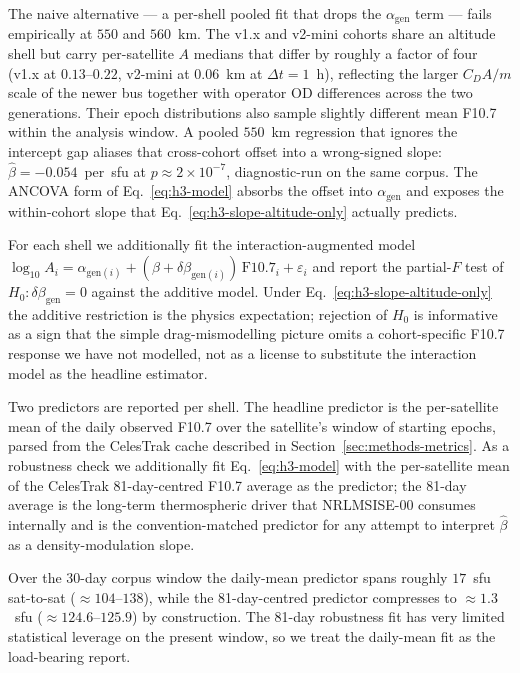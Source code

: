 \documentclass[10pt, letterpaper]{article}
\begin{document}
The naive alternative --- a per-shell pooled fit that drops the
$\alpha_{\mathrm{gen}}$ term --- fails empirically at $550$ and
$560$~km. The v1.x and v2-mini cohorts share an altitude shell
but carry per-satellite $A$ medians that differ by roughly a
factor of four (v1.x at $0.13$--$0.22$, v2-mini at $0.06$~km at
$\Delta t = 1$~h), reflecting the larger $C_{D} A / m$ scale of
the newer bus together with operator OD differences across the
two generations. Their epoch distributions also sample slightly
different mean F10.7 within the analysis window. A pooled
$550$~km regression that ignores the intercept gap aliases that
cross-cohort offset into a wrong-signed slope:
$\hat\beta = -0.054$~per~sfu at $p \approx 2\times 10^{-7}$,
diagnostic-run on the same corpus. The ANCOVA form of
Eq.~\eqref{eq:h3-model} absorbs the offset into
$\alpha_{\mathrm{gen}}$ and exposes the within-cohort slope that
Eq.~\eqref{eq:h3-slope-altitude-only} actually predicts.

For each shell we additionally fit the interaction-augmented
model
$\log_{10} A_{i} = \alpha_{\mathrm{gen}(i)} +
(\beta + \delta\beta_{\mathrm{gen}(i)})\,\mathrm{F}10.7_{i} +
\varepsilon_{i}$
and report the partial-$F$ test of
$H_{0}\!: \delta\beta_{\mathrm{gen}} = 0$ against the additive
model. Under Eq.~\eqref{eq:h3-slope-altitude-only} the additive
restriction is the physics expectation; rejection of $H_{0}$ is
informative as a sign that the simple drag-mismodelling picture
omits a cohort-specific F10.7 response we have not modelled, not
as a license to substitute the interaction model as the headline
estimator.

Two predictors are reported per shell. The headline predictor
is the per-satellite mean of the daily observed F10.7 over the
satellite's window of starting epochs, parsed from the CelesTrak
cache described in Section~\ref{sec:methods-metrics}. As a
robustness check we additionally fit Eq.~\eqref{eq:h3-model}
with the per-satellite mean of the CelesTrak 81-day-centred
F10.7 average as the predictor; the 81-day average is the
long-term thermospheric driver that NRLMSISE-00 consumes
internally and is the convention-matched predictor for any
attempt to interpret $\hat\beta$ as a density-modulation slope.

Over the 30-day corpus window the daily-mean predictor spans
roughly $17$~sfu sat-to-sat ($\approx 104$--$138$), while the
81-day-centred predictor compresses to $\approx 1.3$~sfu
($\approx 124.6$--$125.9$) by construction. The 81-day
robustness fit has very limited statistical leverage on the
present window, so we treat the daily-mean fit as the
load-bearing report.
\end{document}
